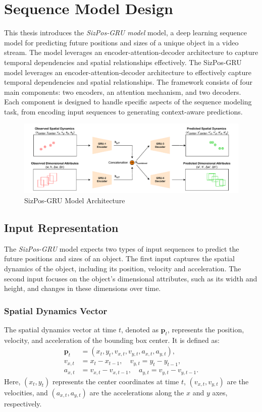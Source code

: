 \documentclass[12pt,oneside]{book} %
\begin{document}
\section{Sequence Model Design}
This thesis introduces the \textit{SizPos-GRU model} model, a deep learning
sequence model for predicting future positions and sizes of a unique object in
a video stream. The model leverages an encoder-attention-decoder architecture
to capture temporal dependencies and spatial relationships effectively. The
SizPos-GRU model leverages an encoder-attention-decoder architecture to
effectively capture temporal dependencies and spatial relationships. The
framework consists of four main components: two encoders, an attention
mechanism, and two decoders. Each component is designed to handle specific
aspects of the sequence modeling task, from encoding input sequences to
generating context-aware predictions.

\begin{figure}[H]
    \centering
    \includegraphics[width=1\textwidth]{figures/GRUSizPos.drawio.pdf}
    \caption{SizPos-GRU Model Architecture}\label{fig:sizpos-gru}
\end{figure}

\subsection{Input Representation}
The \textit{SizPos-GRU} model expects two types of input sequences to predict
the future positions and sizes of an object. The first input captures the
spatial dynamics of the object, including its position, velocity and
acceleration. The second input focuses on the object's dimensional attributes,
such as its width and height, and changes in these dimensions over time.

\subsubsection*{Spatial Dynamics Vector}
The spatial dynamics vector at time $t$, denoted as $\mathbf{p}_t$, represents the position, velocity, and acceleration of the bounding box center. It is defined as:
\begin{align}
    \mathbf{p}_t & = \left(x_t, y_t, v_{x,t}, v_{y,t}, a_{x,t}, a_{y,t}\right), \\
    v_{x,t}      & = x_t - x_{t-1}, \quad v_{y,t} = y_t - y_{t-1},              \\
    a_{x,t}      & = v_{x,t} - v_{x,t-1}, \quad a_{y,t} = v_{y,t} - v_{y,t-1}.
\end{align}
Here, $(x_t, y_t)$ represents the center coordinates at time $t$, $(v_{x,t}, v_{y,t})$ are the velocities, and $(a_{x,t}, a_{y,t})$ are the accelerations along the $x$ and $y$ axes, respectively.
\end{document}
